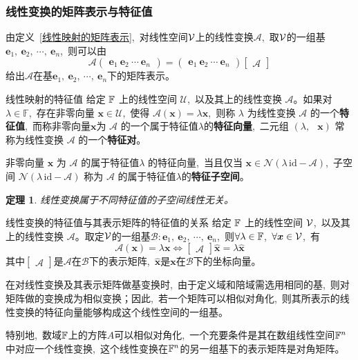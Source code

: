\documentclass[10pt, a4paper, oneside, fontset=none]{ctexart}
\theoremstyle{plain}
\newtheorem{theorem}{定理}[section]
\theoremstyle{definition}
\newcommand{\com}{,\,\,\,\:}
\newcommand{\de}[2][]{\begin{defil}{#1}\kai #2\end{defil}}
\newcommand{\di}[2][]{\begin{theo}{#1}\run #2\end{theo}}
\newcommand{\tboba}[1]{\textbf{\kai\color{bali!75!black}#1}}
\begin{document}
\subsubsection{线性变换的矩阵表示与特征值}
由定义~\ref{线性映射的矩阵表示}\com 对线性空间$\mathcal{V}$上的线性变换$\mathscr{A}$\com 取$\mathcal{V}$的一组基$\boldsymbol{e}_1,~\boldsymbol{e}_2,~\cdots,~\boldsymbol{e}_n$\com 则可以由
$$\mathscr{A}\begin{pmatrix}
    \boldsymbol{e}_1~\boldsymbol{e}_2~\cdots~\boldsymbol{e}_n
\end{pmatrix}=\begin{pmatrix}
    \boldsymbol{e}_1~\boldsymbol{e}_2~\cdots~\boldsymbol{e}_n
\end{pmatrix}\begin{bmatrix} \mathscr{A} \end{bmatrix}$$
给出$\mathscr{A}$在基$\boldsymbol{e}_1,~\boldsymbol{e}_2,~\cdots,~\boldsymbol{e}_n$下的矩阵表示。

\de[线性映射的特征值]{
    给定 $\mathbb{F}$ 上的线性空间 $\mathcal{U}$\com 以及其上的线性变换 $\mathscr{A}$。如果对$\lambda\in\mathbb{F}$\com 存在非零向量 $\boldsymbol{x}\in\mathcal{U}$\com 使得 $\mathscr{A}(\boldsymbol{x})=\lambda\boldsymbol{x}$\com 则称 $\lambda$ 为线性变换 $\mathscr{A}$ 的一个\tboba{特征值}\com 而称非零向量$\boldsymbol{x}$为 $\mathscr{A}$ 的一个属于特征值$\lambda$的\tboba{特征向量}\com 二元组 $(\lambda\com \boldsymbol{x})$ 常称为线性变换 $\mathscr{A}$ 的一个\tboba{特征对}。
    
    非零向量 $\boldsymbol{x}$ 为 $\mathscr{A}$ 的属于特征值$\lambda$ 的特征向量\com 当且仅当 $\boldsymbol{x}\in\mathcal{N}(\lambda\,\mathrm{id}-\mathscr{A})$\com 子空间 $\mathcal{N}(\lambda\,\mathrm{id}-\mathscr{A})$ 称为 $\mathscr{A}$ 的属于特征值$\lambda$的\tboba{特征子空间}。
}
\begin{theorem}
    线性变换属于不同特征值的子空间线性无关。
\end{theorem}
\di[线性变换的特征值与其表示矩阵的特征值的关系]{
    给定 $\mathbb{F}$ 上的线性空间 $\mathcal{V}$\com 以及其上的线性变换 $\mathscr{A}$。取定$\mathcal{V}$的一组基$\mathcal{B}:\boldsymbol{e}_1,~\boldsymbol{e}_2,~\cdots,~\boldsymbol{e}_n$\com 则$\forall \lambda \in \mathbb{F}$\com $\forall \boldsymbol{x} \in \mathcal{V}$\com 有
    $$\mathscr{A}(\boldsymbol{x})=\lambda\boldsymbol{x} \Leftrightarrow \begin{bmatrix}
        \mathscr{A}
    \end{bmatrix}\hat{\boldsymbol{x}}=\lambda\hat{\boldsymbol{x}}$$
    其中$\begin{bmatrix}
        \mathscr{A}
    \end{bmatrix}$是$\mathscr{A}$在$\mathcal{B}$下的表示矩阵\com $\hat{\boldsymbol{x}}$是$\boldsymbol{x}$在$\mathcal{B}$下的坐标向量。
}
在对线性变换及其表示矩阵做基变换时\com 由于定义域和陪域需选用相同的基\com 则对矩阵做的变换成为相似变换；因此\com 若一个矩阵可以相似对角化\com 则其所表示的线性变换的特征向量能够构成这个线性空间的一组基。

特别地\com 数域$\mathbb{F}$上的方阵$A$可以相似对角化\com 一个充要条件是其在数组线性空间$\mathbb{F}^n$中对应一个线性变换\com 这个线性变换在$\mathbb{F}^n$的另一组基下的表示矩阵是对角矩阵。
\end{document}
